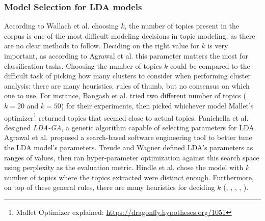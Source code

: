         \subsubsection{Model Selection for LDA models}
        
            According to Wallach et al. \cite{wallach2009rethinking} choosing $k$, the number of topics present in the corpus is one of the most difficult modeling decisions in topic modeling, as there are no clear methods to follow. Deciding on the right value for $k$ is very important, as according to Agrawal et al. \cite{agrawal2018wrong} this parameter matters the most for classification tasks. Choosing the number of topics $k$ could be compared to the difficult task of picking how many clusters to consider when performing cluster analysis: there are many heuristics, rules of thumb, but no consensus on which one to use. For instance, Bangash et al. \cite{bangash2019developers} tried two different number of topics ($k=20$ and $k=50$) for their experiments, then picked whichever model Mallet's optimizer\footnote{Mallet Optimizer explained: \url{https://dragonfly.hypotheses.org/1051}} returned topics that seemed close to actual topics. Panichella et al. \cite{panichella2013effectively} designed \textit{LDA-GA}, a genetic algorithm capable of selecting parameters for LDA. Agrawal et al. \cite{agrawal2018wrong} proposed a search-based software engineering tool to better tune the LDA model's parameters. Treude and Wagner \cite{treude2019predicting} defined LDA's parameters as ranges of values, then ran hyper-parameter optimization against this search space using perplexity as the evaluation metric. Hindle et al. \cite{hindle2012relating} chose the model with $k$ number of topics where the topics extracted were distinct enough. Furthermore, on top of these general rules, there are many heuristics for deciding $k$ (\cite{arun2010finding}, \cite{cao2009density}, \cite{deveaud2014accurate}, \cite{griffiths2004finding}, \cite{zhao2015heuristic}).
            
